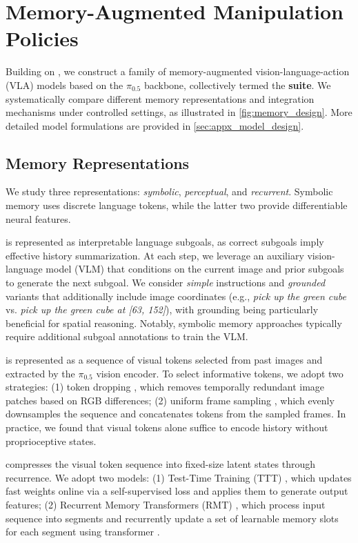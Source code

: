 \section{Memory-Augmented Manipulation Policies}
\label{sec:method}

Building on \benchname, we construct a family of memory-augmented vision-language-action (VLA) models based on the $\pi_{0.5}$ backbone, collectively termed the \textbf{\modelname\xspace suite}.
We systematically compare different memory representations and integration mechanisms under controlled settings, as illustrated in \cref{fig:memory_design}.
More detailed model formulations are provided in \cref{sec:appx_model_design}.

\subsection{Memory Representations}

We study three representations: \textit{symbolic}, \textit{perceptual}, and \textit{recurrent}.
Symbolic memory uses discrete language tokens, while the latter two provide differentiable neural features.

 is represented as interpretable language subgoals, as correct subgoals imply effective history summarization. At each step, we leverage an auxiliary vision-language model (VLM) that conditions on the current image and prior subgoals to generate the next subgoal. We consider \emph{simple} instructions and \emph{grounded} variants that additionally include image coordinates (e.g., \textit{pick up the green cube} vs. \textit{pick up the green cube at [63, 152]}), with grounding being particularly beneficial for spatial reasoning. Notably, symbolic memory approaches typically require additional subgoal annotations to train the VLM.

 is represented as a sequence of visual tokens selected from past images and  extracted by the $\pi_{0.5}$ vision encoder. To select informative tokens, we adopt two strategies: (1) token dropping \cite{yao2025timechat}, which removes temporally redundant image patches based on RGB differences; (2) uniform frame sampling \cite{chen2024videollm}, which evenly downsamples the sequence and concatenates tokens from the sampled frames. In practice, we found that visual tokens alone suffice to encode history without proprioceptive states.

 compresses the visual token sequence into fixed-size latent states through recurrence. We adopt two models: (1) Test-Time Training (TTT) \cite{sun2024learning, zhang2025test}, which updates fast weights online via a self-supervised loss and applies them to generate output features; (2) Recurrent Memory Transformers (RMT) \cite{bulatov2022recurrent, bulatov2023scaling}, which process input sequence into segments and recurrently update a set of learnable memory slots for each segment using transformer \cite{vaswani2017attention}.


